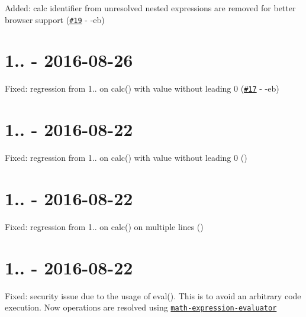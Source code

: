 
\begin{DoxyItemize}
\item Added\+: calc identifier from unresolved nested expressions are removed for better browser support (\href{https://github.com/MoOx/reduce-css-calc/pull/19}{\tt \#19} -\/ -\/eb)
\end{DoxyItemize}

\section*{1.. -\/ 2016-\/08-\/26}


\begin{DoxyItemize}
\item Fixed\+: regression from 1.. on calc() with value without leading 0 (\href{https://github.com/MoOx/reduce-css-calc/pull/17}{\tt \#17} -\/ -\/eb)
\end{DoxyItemize}

\section*{1.. -\/ 2016-\/08-\/22}


\begin{DoxyItemize}
\item Fixed\+: regression from 1.. on calc() with value without leading 0 ()
\end{DoxyItemize}

\section*{1.. -\/ 2016-\/08-\/22}


\begin{DoxyItemize}
\item Fixed\+: regression from 1.. on calc() on multiple lines ()
\end{DoxyItemize}

\section*{1.. -\/ 2016-\/08-\/22}


\begin{DoxyItemize}
\item Fixed\+: security issue due to the usage of {\ttfamily eval()}. This is to avoid an arbitrary code execution. Now operations are resolved using \href{https://github.com/redhivesoftware/math-expression-evaluator}{\tt {\ttfamily math-\/expression-\/evaluator}}
\end{DoxyItemize}

